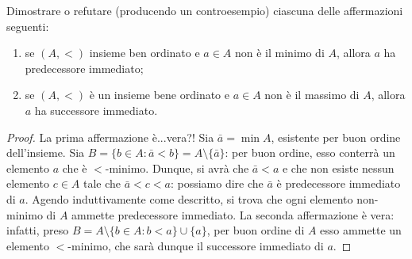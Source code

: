 \begin{exe}
  Dimostrare o refutare (producendo un controesempio) ciascuna delle affermazioni seguenti:
  \begin{enumerate}
    \item se \((A,<)\) insieme ben ordinato e \(a \in A\) non è il minimo di \(A\), allora \(a\) ha predecessore immediato;
    \item se \((A,<)\) è un insieme bene ordinato e \(a \in A\) non è il massimo di \(A\), allora \(a\) ha successore immediato.
  \end{enumerate}
\end{exe}
\begin{proof}
  La prima affermazione è...vera?! Sia \(\bar{a} = \min A\), esistente per buon ordine dell'insieme. Sia \(B = \lbrace b \in A \colon \bar{a} < b \rbrace = A \setminus \lbrace \bar{a} \rbrace\): per buon ordine, esso conterrà un elemento \(a\) che è \(<\)-minimo. Dunque, si avrà che \(\bar{a} < a\) e che non esiste nessun elemento \(c \in A\) tale che \(\bar{a} < c < a\): possiamo dire che \(\bar{a}\) è predecessore immediato di \(a\). Agendo induttivamente come descritto, si trova che ogni elemento non-minimo di \(A\) ammette predecessore immediato.
  La seconda affermazione è vera: infatti, preso \(B = A \setminus \lbrace b \in A \colon b < a\rbrace \cup \lbrace a \rbrace\), per buon ordine di \(A\) esso ammette un elemento \(<\)-minimo, che sarà dunque il successore immediato di \(a\).
\end{proof}
